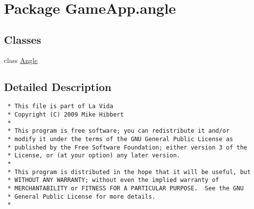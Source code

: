\hypertarget{namespaceGameApp_1_1angle}{
\section{Package GameApp.angle}
\label{namespaceGameApp_1_1angle}
}


\subsection*{Classes}
\begin{CompactItemize}
\item 
class \hyperlink{classGameApp_1_1angle_1_1Angle}{Angle}
\end{CompactItemize}


\subsection{Detailed Description}


\footnotesize\begin{verbatim}
 * This file is part of La Vida
 * Copyright (C) 2009 Mike Hibbert
 *
 * This program is free software; you can redistribute it and/or
 * modify it under the terms of the GNU General Public License as
 * published by the Free Software Foundation; either version 3 of the
 * License, or (at your option) any later version.
 *
 * This program is distributed in the hope that it will be useful, but
 * WITHOUT ANY WARRANTY; without even the implied warranty of
 * MERCHANTABILITY or FITNESS FOR A PARTICULAR PURPOSE.  See the GNU
 * General Public License for more details.
 *
\end{verbatim}
\normalsize
 